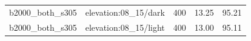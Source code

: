 \begin{longtable}{l>{\raggedright\arraybackslash}p{.42\linewidth}rrr}
b2000\_\allowbreak{}both\_\allowbreak{}s305 & %
elevation:08\_\allowbreak{}15/dark & %
400 & %
13.25 & %
95.21 \\ %

b2000\_\allowbreak{}both\_\allowbreak{}s305 & %
elevation:08\_\allowbreak{}15/light & %
400 & %
13.00 & %
95.11 \\ %


\end{longtable}
